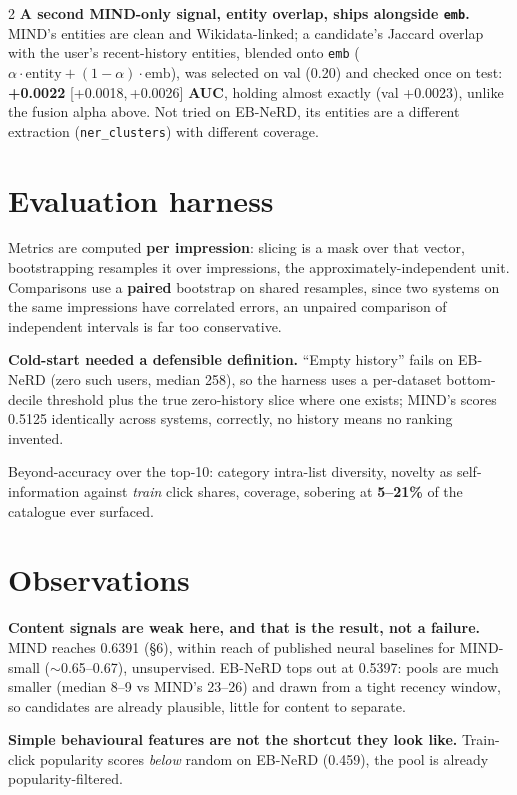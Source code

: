 \documentclass[10pt,a4paper]{article}
\newcommand{\ci}[2]{{\scriptsize[#1,\,#2]}}
\begin{document}
\begin{multicols}{2}
\textbf{A second MIND-only signal, entity overlap, ships alongside \texttt{emb}.} MIND's entities are
clean and Wikidata-linked; a candidate's Jaccard overlap with the user's recent-history entities,
blended onto \texttt{emb} ($\alpha\cdot\text{entity} + (1-\alpha)\cdot\text{emb}$), was selected on val
(0.20) and checked once on test: \textbf{+0.0022} \ci{+0.0018}{+0.0026} \textbf{AUC}, holding almost
exactly (val +0.0023), unlike the fusion alpha above. Not tried on EB-NeRD, its entities are a
different extraction (\texttt{ner\_clusters}) with different coverage.

\section{Evaluation harness}

Metrics are computed \textbf{per impression}: slicing is a mask over that vector, bootstrapping
resamples it over impressions, the approximately-independent unit. Comparisons use a \textbf{paired}
bootstrap on shared resamples, since two systems on the same impressions have correlated errors, an
unpaired comparison of independent intervals is far too conservative.

\textbf{Cold-start needed a defensible definition.} ``Empty history'' fails on EB-NeRD (zero such
users, median 258), so the harness uses a per-dataset bottom-decile threshold plus the true
zero-history slice where one exists; MIND's scores 0.5125 identically across systems, correctly, no
history means no ranking invented.

Beyond-accuracy over the top-10: category intra-list diversity, novelty as self-information against
\emph{train} click shares, coverage, sobering at \textbf{5--21\%} of the catalogue ever surfaced.

\section{Observations}

\textbf{Content signals are weak here, and that is the result, not a failure.} MIND reaches 0.6391
(\S6), within reach of published neural baselines for MIND-small ($\sim$0.65--0.67), unsupervised.
EB-NeRD tops out at 0.5397: pools are much smaller (median 8--9 vs MIND's 23--26) and drawn from a
tight recency window, so candidates are already plausible, little for content to separate.

\textbf{Simple behavioural features are not the shortcut they look like.} Train-click popularity
scores \emph{below} random on EB-NeRD (0.459), the pool is already popularity-filtered.


\end{multicols}
\end{document}
